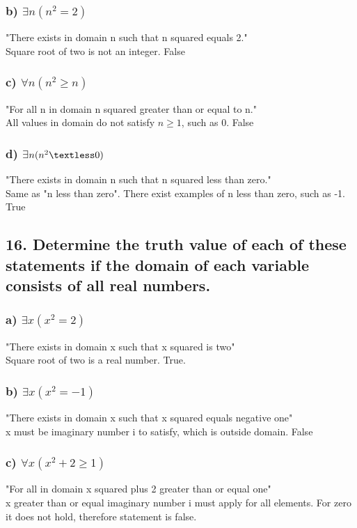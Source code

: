 \documentclass[11pt, oneside]{article} %
\numberwithin{equation}{section} %
\numberwithin{figure}{section} %
\numberwithin{table}{section} %
\begin{document}
\subsubsection{b) $\exists$$n(n^2 = 2)$}
"There exists in domain n such that n squared equals 2."\\
Square root of two is not an integer. False
\subsubsection{c) $\forall$$n(n^2 \geq n)$}
"For all n in domain n squared greater than or equal to n." \\
All values in domain do not satisfy $n \geq 1$, such as 0. False
\subsubsection{d) $\exists$$n(n^2 \textless 0)$}
"There exists in domain n such that n squared less than zero."\\
Same as "n less than zero". There exist examples of n less than zero, such as -1. True

\subsection{16. Determine the truth value of each of these statements if the domain of each variable consists of all real numbers.}
\subsubsection{a) $\exists$$x(x^2 = 2)$}
"There exists in domain x such that x squared is two"\\
Square root of two is a real number. True.
\subsubsection{b) $\exists$$x(x^2 = -1)$}
"There exists in domain x such that x squared equals negative one"\\
x must be imaginary number i to satisfy, which is outside domain. False
\subsubsection{c) $\forall$$x(x^2 + 2 \geq 1)$}
"For all in domain x squared plus 2 greater than or equal one"\\
x greater than or equal imaginary number i must apply for all elements. For zero it does not hold, therefore statement is false.   
\end{document}
